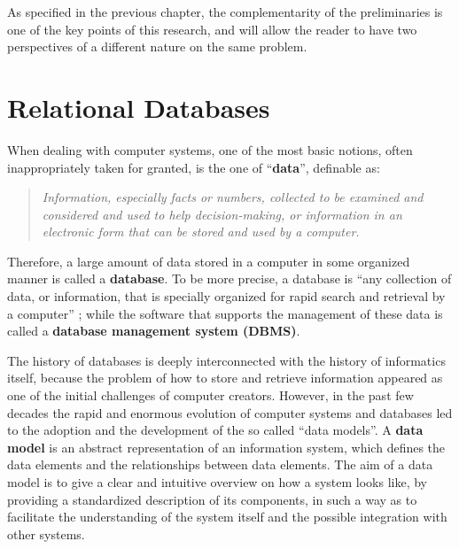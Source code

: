 As specified in the previous chapter, the complementarity of the preliminaries is one of the key points of this research, and will allow the reader to have two perspectives of a different nature on the same problem.


\section{Relational Databases}
When dealing with computer systems, one of the most basic notions, often inappropriately taken for granted, is the one of ``\textbf{data}'', definable as:
\begin{quote}\emph{Information, especially facts or numbers, collected to be examined and considered and used to help decision-making, or information in an electronic form that can be stored and used by a computer.} \cite{cambridge2013data}\end{quote}
Therefore, a large amount of data stored in a computer in some organized manner is called a \textbf{database}. To be more precise, a database is ``any collection of data, or information, that is specially organized for rapid search and retrieval by a computer'' \cite{britannica2020database}; while the software that supports the management of these data is called a \textbf{database management system (DBMS)}.

The history of databases is deeply interconnected with the history of informatics itself, because the problem of how to store and retrieve information appeared as one of the initial challenges of computer creators. However, in the past few decades the rapid and enormous evolution of computer systems and databases led to the adoption and the development of the so called ``data models''. A \textbf{data model} is an abstract representation of an information system, which defines the data elements and the relationships between data elements. The aim of a data model is to give a clear and intuitive overview on how a system looks like, by providing a standardized description of its components, in such a way as to facilitate the understanding of the system itself and the possible integration with other systems.

